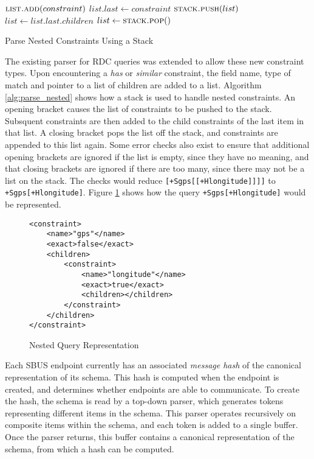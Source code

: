 \documentclass[12pt,twoside,notitlepage]{report}
\begin{document}
\begin{algorithm}
\begin{algorithmic}[1]
		\State $\Call{list.add}{constraint}$
		\State $list.last \gets constraint$
	\Else
			\State $\Call{stack.push}{list}$
			\State $list \gets list.last.children$
			\State $list \gets \Call{stack.pop}$
		\EndIf
	\EndIf
\EndWhile
\end{algorithmic}
\caption{Parse Nested Constraints Using a Stack}
\label{alg:parse_nested}
\end{algorithm} 

The existing parser for RDC queries was extended to allow these new constraint types. 
Upon encountering a {\sl has} or {\sl similar} constraint, the field name, type of match and pointer to a list of children are added to a list. 
Algorithm \ref{alg:parse_nested} shows how a stack is used to handle nested constraints. 
An opening bracket causes the list of constraints to be pushed to the stack.
Subsquent constraints are then added to the child constraints of the last item in that list. 
A closing bracket pops the list off the stack, and constraints are appended to this list again. 
Some error checks also exist to ensure that additional opening brackets are ignored if the list is empty, since they have no meaning, and that closing brackets are ignored if there are too many, since there may not be a list on the stack. 
The checks would reduce {\tt [+Sgps[[+Hlongitude]]]]} to {\tt +Sgps[+Hlongitude]}.
Figure \ref{fig:nested_query} shows how the query {\tt +Sgps[+Hlongitude]} would be represented.

\begin{figure}
\begin{lstlisting}
<constraint>
	<name>"gps"</name>
	<exact>false</exact>
	<children>
		<constraint>
			<name>"longitude"</name>
			<exact>true</exact>
			<children></children>
		</constraint>
	</children>
</constraint>
\end{lstlisting}
\caption{Nested Query Representation}
\label{fig:nested_query}
\end{figure} 

Each SBUS endpoint currently has an associated {\sl message hash} of the canonical representation of its schema. 
This hash is computed when the endpoint is created, and determines whether endpoints are able to communicate. 
To create the hash, the schema is read by a top-down parser, which generates tokens representing different items in the schema. 
This parser operates recursively on composite items within the schema, and each token is added to a single buffer. 
Once the parser returns, this buffer contains a canonical representation of the schema, from which a hash can be computed. 
\end{document}
